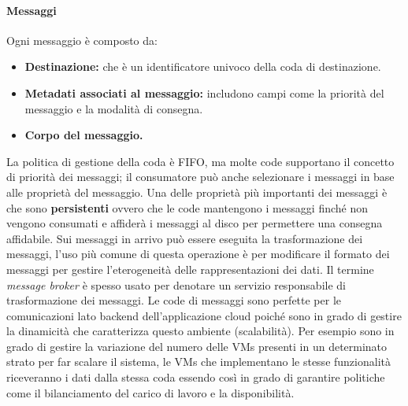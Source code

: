 \documentclass{article}
\begin{document}
\paragraph{Messaggi}
Ogni messaggio è composto da:
\begin{itemize}
    \item \textbf{Destinazione:} che è un identificatore univoco della coda di destinazione.
    \item \textbf{Metadati associati al messaggio:} includono campi come la priorità del messaggio e la modalità di consegna.
    \item \textbf{Corpo del messaggio.}
\end{itemize}
La politica di gestione della coda è FIFO, ma molte code supportano il concetto di priorità dei messaggi; il consumatore può anche selezionare i messaggi in base alle proprietà del messaggio.
Una delle proprietà più importanti dei messaggi è che sono \textbf{persistenti} ovvero che le code mantengono i messaggi finché non vengono consumati e affiderà i messaggi al disco per permettere una consegna affidabile.
Sui messaggi in arrivo può essere eseguita la trasformazione dei messaggi, l'uso più comune di questa operazione è per modificare il formato dei messaggi per gestire l'eterogeneità delle rappresentazioni dei dati. Il termine \textit{message broker} è spesso usato per denotare un servizio responsabile di trasformazione dei messaggi.
Le code di messaggi sono perfette per le comunicazioni lato backend dell'applicazione cloud poiché sono in grado di gestire la dinamicità che caratterizza questo ambiente (scalabilità). Per esempio sono in grado di gestire la variazione del numero delle VMs presenti in un determinato strato per far scalare il sistema, le VMs che implementano le stesse funzionalità riceveranno i dati dalla stessa coda essendo così in grado di garantire politiche come il bilanciamento del carico di lavoro e la disponibilità.
\end{document}
